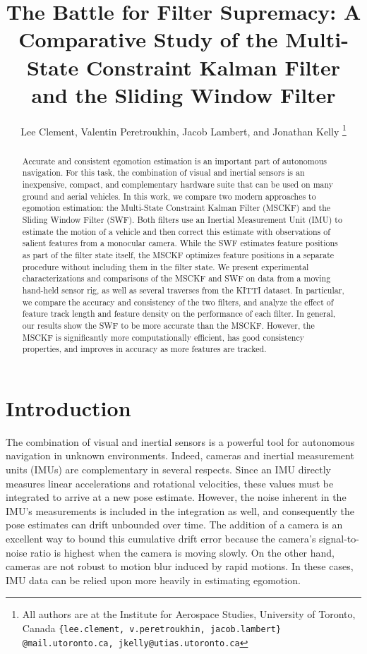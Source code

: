 \documentclass[letterpaper, 10 pt, conference]{ieeeconf}  %
\title{\LARGE \bf
The Battle for Filter Supremacy: A Comparative Study of the Multi-State Constraint Kalman Filter and the Sliding Window Filter
}
\author{Lee Clement, Valentin Peretroukhin, Jacob Lambert, and Jonathan Kelly%
\thanks{All authors are at the Institute for Aerospace Studies, University of Toronto, Canada
        {\tt \{lee.clement, v.peretroukhin, jacob.lambert\} @mail.utoronto.ca, jkelly@utias.utoronto.ca}
        }%
}
\begin{document}
\maketitle
\thispagestyle{empty}
\pagestyle{empty}


\begin{abstract}
Accurate and consistent egomotion estimation is an important part of autonomous navigation.
For this task, the combination of visual and inertial sensors is an inexpensive, compact, and complementary hardware suite that can be used on many ground and aerial vehicles.
In this work, we compare two modern approaches to egomotion estimation: the Multi-State Constraint Kalman Filter (MSCKF) and the Sliding Window Filter (SWF).
Both filters use an Inertial Measurement Unit (IMU) to estimate the motion of a vehicle and then correct this estimate with observations of salient features from a monocular camera.
While the SWF estimates feature positions as part of the filter state itself, the MSCKF optimizes feature positions in a separate procedure without including them in the filter state.
We present experimental characterizations and comparisons of the MSCKF and SWF on data from a moving hand-held sensor rig, as well as several traverses from the KITTI dataset.
In particular, we compare the accuracy and consistency of the two filters, and analyze the effect of feature track length and feature density on the performance of each filter.
In general, our results show the SWF to be more accurate than the MSCKF.
However, the MSCKF is significantly more computationally efficient, has good consistency properties, and improves in accuracy as more features are tracked. 
\end{abstract}


\section{Introduction} \label{sec:introduction}

The combination of visual and inertial sensors is a powerful tool for autonomous navigation in unknown environments.
Indeed, cameras and inertial measurement units (IMUs) are complementary in several respects.
Since an IMU directly measures linear accelerations and rotational velocities, these values must be integrated to arrive at a new pose estimate.
However, the noise inherent in the IMU's measurements is included in the integration as well, and consequently the pose estimates can drift unbounded over time.
The addition of a camera is an excellent way to bound this cumulative drift error because the camera's signal-to-noise ratio is highest when the camera is moving slowly.
On the other hand, cameras are not robust to motion blur induced by rapid motions.
In these cases, IMU data can be relied upon more heavily in estimating egomotion.
\end{document}
